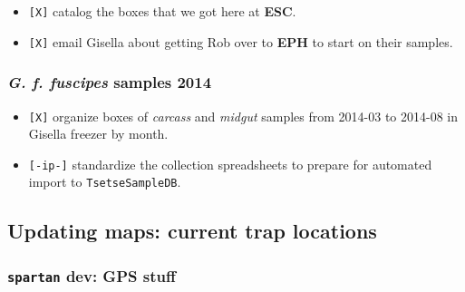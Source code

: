 \documentclass[letterpaper]{scrartcl}
\begin{document}
\begin{itemize}
\itemsep1pt\parskip0pt
\item
  \texttt{{[}X{]}} catalog the boxes that we got here at \textbf{ESC}.
\item
  \texttt{{[}X{]}} email Gisella about getting Rob over to \textbf{EPH}
  to start on their samples.
\end{itemize}

\subsubsection{\emph{G. f. fuscipes} samples
2014}\label{g.-f.-fuscipes-samples-2014}

\begin{itemize}
\itemsep1pt\parskip0pt
\item
  \texttt{{[}X{]}} organize boxes of \emph{carcass} and \emph{midgut}
  samples from 2014-03 to 2014-08 in Gisella freezer by month.
\item
  \texttt{{[}-ip-{]}} standardize the collection spreadsheets to prepare
  for automated import to \texttt{TsetseSampleDB}.
\end{itemize}

\subsection{Updating maps: current trap
locations}\label{updating-maps-current-trap-locations-3}

\subsubsection{\texttt{spartan} dev: GPS
stuff}\label{spartan-dev-gps-stuff-3}
\end{document}

